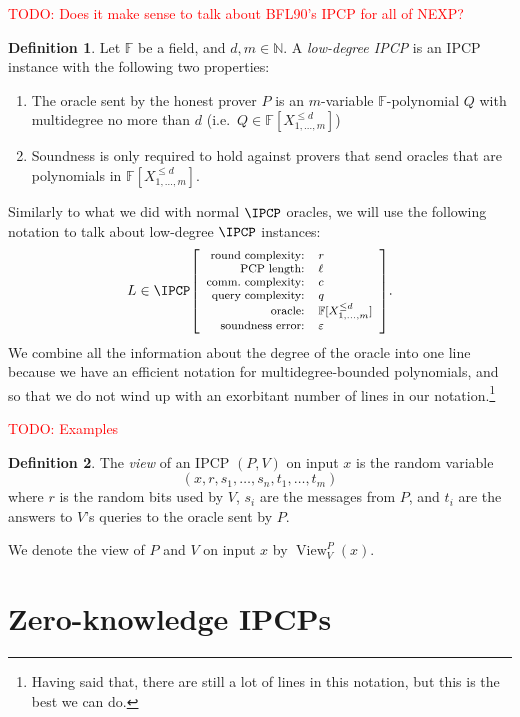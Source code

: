 \documentclass[english,12pt]{reedthesis}
\theoremstyle{plain}
\theoremstyle{definition}
\newtheorem{defn}[defn]{Definition}
\theoremstyle{remark}
\DeclareMathOperator{\View}{View}
\newcommand{\ldipcp}[6]{%
  \ensuremath%
  \mleft[{\footnotesize\begin{array}{r l}
    \text{round complexity:} & #1 \\
    \text{PCP length:} & #2 \\
    \text{comm.\ complexity:} & #3 \\
    \text{query complexity:} & #4 \\
    \text{oracle:} & #5 \\
    \text{soundness error:} & #6
  \end{array}}\mright]%
}
\newcommand{\TODO}[1]{\textcolor{red}{TODO: #1}}
\begin{document}
\TODO{Does it make sense to talk about BFL90's IPCP for all of NEXP?}

\begin{defn}\label{def:low-deg-ipcp}
  Let $\mathbb{F}$ be a field, and $d, m \in \mathbb{N}$. A \emph{low-degree IPCP} is an
  IPCP instance with the following two properties:
  \begin{enumerate}
    \item The oracle sent by the honest prover $P$ is an $m$-variable
          $\mathbb{F}$-polynomial $Q$ with multidegree no more than $d$ (i.e.\
          $Q \in \mathbb{F}[X_{1, \ldots, m}^{\le d}]$)
    \item Soundness is only required to hold against provers that send oracles
          that are polynomials in $\mathbb{F}[X_{1, \ldots, m}^{\le d}]$.
  \end{enumerate}
\end{defn}

Similarly to what we did with normal $\IPCP$ oracles, we will use the following
notation to talk about low-degree $\IPCP$ instances:
\begin{equation*}
  L \in \IPCP\ldipcp{r}{\ell}{c}{q}{\mathbb{F}[X_{1, \ldots, m}^{\le d}]}{\varepsilon}.
\end{equation*}
We combine all the information about the degree of the oracle into one line
because we have an efficient notation for multidegree-bounded polynomials, and
so that we do not wind up with an exorbitant number of lines in our
notation.\footnote{Having said that, there are still a lot of lines in this
  notation, but this is the best we can do.}

\TODO{Examples}

\begin{defn}\label{def:ipcp-view}
  The \emph{view} of an IPCP $(P, V)$ on input $x$ is the random variable
  \[
    (x, r, s_{1}, \ldots, s_{n}, t_{1}, \ldots, t_{m})
  \]
  where $r$ is the random bits used by $V$, $s_{i}$ are the messages from $P$,
  and $t_{i}$ are the answers to $V$'s queries to the oracle sent by $P$.
\end{defn}

We denote the view of $P$ and $V$ on input $x$ by $\View_{V}^{P}(x)$.

\section{Zero-knowledge IPCPs}
\end{document}
